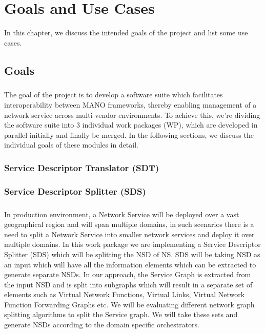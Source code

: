 \chapter{Goals and Use Cases}
\label{ch:Goals and Use Cases}

In this chapter, we discuss the intended goals of the project and list some use cases.

\section{Goals}

\paragraph{}
The goal of the project is to develop a software suite which facilitates interoperability between MANO frameworks, thereby enabling management of a network service across multi-vendor environments. To achieve this, we're dividing the software suite into 3 individual work packages (WP), which are developed in parallel initially and finally be merged. In the following sections, we discuss the individual goals of these modules in detail.

\subsection{Service Descriptor Translator (SDT)}
\paragraph{}

\subsection{Service Descriptor Splitter (SDS)}
\paragraph{}

In production environment, a Network Service will be deployed over a vast geographical region and will span multiple domains, in such scenarios there is a need to split a Network Service into smaller network services and deploy it over multiple domains. In this work package we are implementing a Service Descriptor Splitter (SDS) which will be splitting the NSD of NS. SDS will be taking NSD as an input which will have all the information elements which can be extracted to generate separate NSDs. In our approach, the Service Graph is extracted from the input NSD and is split into subgraphs which will result in a separate set of elements such as Virtual Network Functions, Virtual Links, Virtual Network Function Forwarding Graphs etc. We will be evaluating different network graph splitting algorithms to split the Service graph. We will take these sets and generate NSDs according to the domain specific orchestrators.

